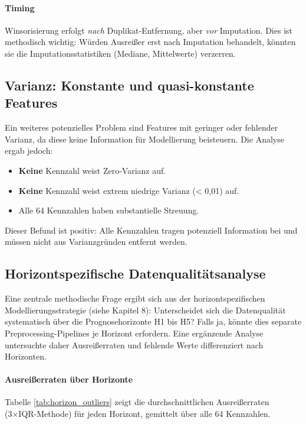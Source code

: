 \paragraph{Timing}
Winsorisierung erfolgt \textit{nach} Duplikat-Entfernung, aber \textit{vor} Imputation. Dies ist methodisch wichtig: Würden Ausreißer erst nach Imputation behandelt, könnten sie die Imputationsstatistiken (Mediane, Mittelwerte) verzerren.

\subsection{Varianz: Konstante und quasi-konstante Features}

Ein weiteres potenzielles Problem sind Features mit geringer oder fehlender Varianz, da diese keine Information für Modellierung beisteuern. Die Analyse ergab jedoch:

\begin{itemize}[topsep=0.2\baselineskip]
    \item \textbf{Keine} Kennzahl weist Zero-Varianz auf.
    \item \textbf{Keine} Kennzahl weist extrem niedrige Varianz (< 0,01) auf.
    \item Alle 64 Kennzahlen haben substantielle Streuung.
\end{itemize}

Dieser Befund ist positiv: Alle Kennzahlen tragen potenziell Information bei und müssen nicht aus Varianzgründen entfernt werden.

\subsection{Horizontspezifische Datenqualitätsanalyse}

Eine zentrale methodische Frage ergibt sich aus der horizontspezifischen Modellierungsstrategie (siehe Kapitel 8): Unterscheidet sich die Datenqualität systematisch über die Prognosehorizonte H1 bis H5? Falls ja, könnte dies separate Preprocessing-Pipelines je Horizont erfordern. Eine ergänzende Analyse untersuchte daher Ausreißerraten und fehlende Werte differenziert nach Horizonten.

\paragraph{Ausreißerraten über Horizonte}

Tabelle \ref{tab:horizon_outliers} zeigt die durchschnittlichen Ausreißerraten (3×IQR-Methode) für jeden Horizont, gemittelt über alle 64 Kennzahlen.


